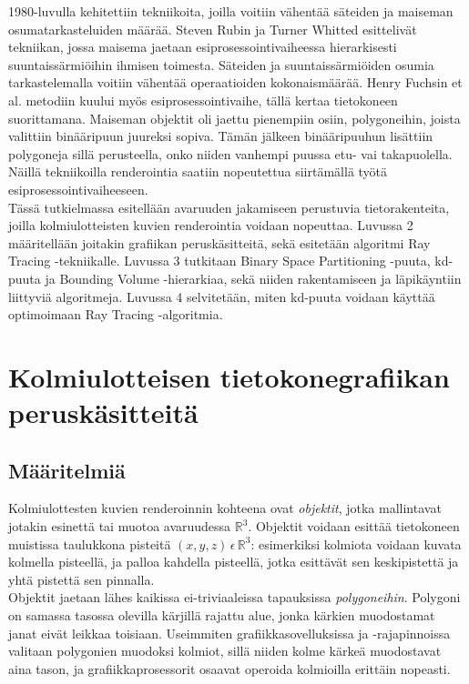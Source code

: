 \documentclass[a4paper,12pt, titlepage]{article}
\theoremstyle{break}
\newcommand{\R}{\mathbb{R}}
\begin{document}
1980-luvulla kehitettiin tekniikoita, joilla voitiin vähentää säteiden ja maiseman osumatarkasteluiden määrää. Steven Rubin ja Turner Whitted esittelivät tekniikan, jossa maisema jaetaan esiprosessointivaiheessa hierarkisesti suuntaissärmiöihin ihmisen toimesta. Säteiden ja suuntaissärmiöiden osumia tarkastelemalla voitiin vähentää operaatioiden kokonaismäärää.\cite{rubin} Henry Fuchsin et al. metodiin kuului myös esiprosessointivaihe, tällä kertaa tietokoneen suorittamana. Maiseman objektit oli jaettu pienempiin osiin, polygoneihin, joista valittiin binääripuun juureksi sopiva. Tämän jälkeen binääripuuhun lisättiin polygoneja sillä perusteella, onko niiden vanhempi puussa etu- vai takapuolella. Näillä tekniikoilla renderointia saatiin nopeutettua siirtämällä työtä esiprosessointivaiheeseen.\cite{fuchs}  \\

Tässä tutkielmassa esitellään avaruuden jakamiseen perustuvia tietorakenteita, joilla kolmiulotteisten kuvien renderointia voidaan nopeuttaa. Luvussa 2 määritellään joitakin grafiikan peruskäsitteitä, sekä esitetään algoritmi Ray Tracing -tekniikalle. Luvussa 3 tutkitaan Binary Space Partitioning -puuta, kd-puuta ja Bounding Volume -hierarkiaa, sekä niiden rakentamiseen ja läpikäyntiin liittyviä algoritmeja. Luvussa 4 selvitetään, miten kd-puuta voidaan käyttää optimoimaan Ray Tracing -algoritmia.


\newpage
\section{Kolmiulotteisen tietokonegrafiikan peruskäsitteitä}
\subsection{Määritelmiä}

Kolmiulottesten kuvien renderoinnin kohteena ovat \emph{objektit}, jotka mallintavat jotakin esinettä tai muotoa avaruudessa $\R^3$. Objektit voidaan esittää tietokoneen muistissa taulukkona pisteitä $(x,y,z)\,\epsilon\,\R^3$: esimerkiksi kolmiota voidaan kuvata kolmella pisteellä, ja palloa kahdella pisteellä, jotka esittävät sen keskipistettä ja yhtä pistettä sen pinnalla.\cite{angel}\\

Objektit jaetaan lähes kaikissa ei-triviaaleissa tapauksissa \emph{polygoneihin}. Polygoni on samassa tasossa olevilla kärjillä rajattu alue, jonka kärkien muodostamat janat eivät leikkaa toisiaan. Useimmiten grafiikkasovelluksissa ja -rajapinnoissa valitaan polygonien muodoksi kolmiot, sillä niiden kolme kärkeä muodostavat aina tason, ja grafiikkaprosessorit osaavat operoida kolmioilla erittäin nopeasti.\cite{angel}\\
\end{document}
